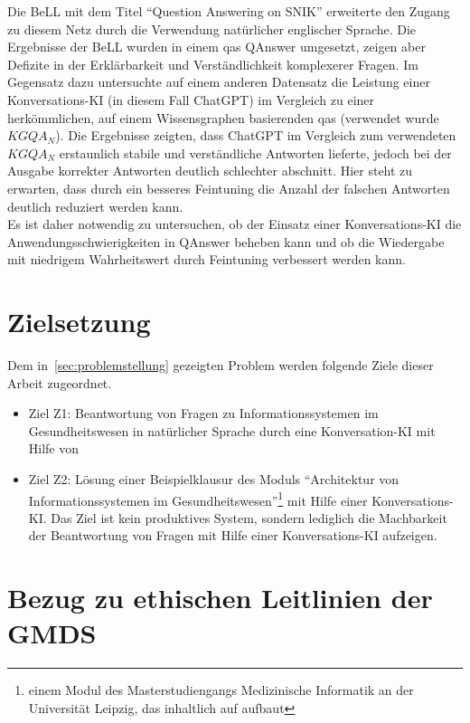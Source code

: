 Die BeLL mit dem Titel \enquote{Question Answering on SNIK} \citep{hannesbell} erweiterte den Zugang zu diesem Netz durch die Verwendung natürlicher englischer Sprache. 
Die Ergebnisse der BeLL wurden in einem \ac{qas} QAnswer \citep{qanswer} umgesetzt, zeigen aber Defizite in der Erklärbarkeit und Verständlichkeit komplexerer Fragen. 
Im Gegensatz dazu untersuchte \citet{chatgpt_qas} auf einem anderen Datensatz die Leistung einer Konversations-KI (in diesem Fall ChatGPT) im Vergleich zu einer herkömmlichen, auf einem Wissensgraphen basierenden \ac{qas} (verwendet wurde $KGQA_N$).
Die Ergebnisse zeigten, dass ChatGPT im Vergleich zum verwendeten $KGQA_N$ erstaunlich stabile und verständliche Antworten lieferte, jedoch bei der Ausgabe korrekter Antworten deutlich schlechter abschnitt. Hier steht zu erwarten, dass durch ein besseres Feintuning die Anzahl der falschen Antworten deutlich reduziert werden kann.\\

Es ist daher notwendig zu untersuchen, ob der Einsatz einer Konversations-KI die Anwendungsschwierigkeiten in QAnswer beheben kann und ob die Wiedergabe mit niedrigem Wahrheitswert durch Feintuning verbessert werden kann.

\section{Zielsetzung}\label{sec:zielsetzung}

Dem in~\ref{sec:problemstellung} gezeigten Problem werden folgende Ziele dieser Arbeit zugeordnet.
\begin{itemize}
  \item Ziel Z1: Beantwortung von Fragen zu Informationssystemen im Gesundheitswesen in natürlicher Sprache durch eine Konversation-KI mit Hilfe von \citet{bb}
  \item Ziel Z2: Lösung einer Beispielklausur des Moduls \enquote{Architektur von Informationssystemen im Gesundheitswesen}\footnote{\raggedright{}einem Modul des Masterstudiengangs Medizinische Informatik an der Universität Leipzig, das inhaltlich auf \citet{bb} aufbaut} mit Hilfe einer Konversations-KI.\@
  Das Ziel ist kein produktives System, sondern lediglich die Machbarkeit der Beantwortung von Fragen mit Hilfe einer Konversations-KI aufzeigen.
\end{itemize}

\section{Bezug zu ethischen Leitlinien der GMDS}

